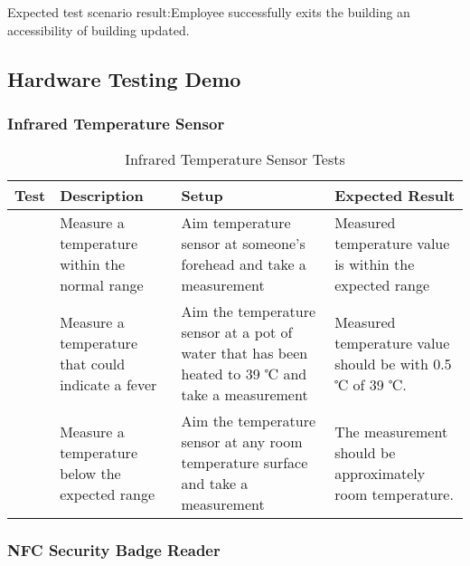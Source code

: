\noindent
Expected test scenario result:Employee successfully exits the building an
accessibility of building updated.   

\subsection{Hardware Testing Demo}

\subsubsection{Infrared Temperature Sensor}

\begin{table*}[htb]
\centering
\begin{tabular}{>{\centering\arraybackslash}m{0.75cm}|>{\centering\arraybackslash}m{4cm}|>{\centering\arraybackslash}m{4.5cm}|>{\centering\arraybackslash}m{4cm}}
\toprule
Test & Description & Setup & Expected Result \\
\midrule
1 & Measure a temperature within the normal range & Aim temperature sensor at
someone's forehead and take a measurement & Measured temperature value is within
the expected range \\
\hline
2 & Measure a temperature that could indicate a fever & Aim the temperature
sensor at a pot of water that has been heated to 39 ℃ and take a measurement &
Measured temperature value should be with 0.5 ℃ of 39 ℃. \\
\hline
3 & Measure a temperature below the expected range & Aim the temperature sensor
at any room temperature surface and take a measurement & The measurement should be
approximately room temperature. \\
\bottomrule
\end{tabular}
\caption{Infrared Temperature Sensor Tests}
\label{table:ir-tests}
\end{table*}

\subsubsection{NFC Security Badge Reader}

